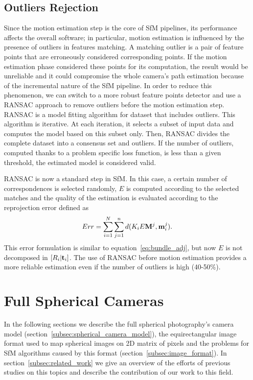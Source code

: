 \subsection{Outliers Rejection}
Since the motion estimation step is the core of SfM pipelines, its performance
affects the overall software; in particular, motion estimation is influenced 
by the presence of outliers in features matching.
A matching outlier is a pair of feature points that are erroneously considered 
corresponding points. If the motion estimation phase considered these points for
its computation, the result would be unreliable and it could compromise the 
whole camera's path estimation because of the incremental nature of the SfM 
pipeline.
In order to reduce this phenomenon, we can switch to a more robust feature points
detector and use a RANSAC approach to remove outliers before the motion estimation step.
RANSAC\cite{fischler1981random} is a model fitting algorithm for dataset that includes outliers.
This algorithm is iterative. At each iteration, it selects a subset of input data and computes the model based on this subset only. Then, RANSAC divides the complete dataset into a consensus set and outliers. If the number of outliers, computed thanks to a problem specific loss function, is
less than a given threshold, the estimated model is considered valid.

RANSAC is now a standard step in SfM. In this case, a certain number of correspondences is selected randomly, $E$ is computed 
according to the selected matches and the quality of the estimation is evaluated 
according to the reprojection error defined as
%
\begin{equation*}
	Err =  
	\sum_{i = 1}^N\sum_{j = 1}^n 
	d(K_iE\mathbf{M}^j, \mathbf{m}_i^j) \text{.}
\end{equation*}
%
This error formulation is similar to equation~\ref{eq:bundle_adj}, 
but now $E$ is not decomposed in $[R_i|\mathbf{t}_i]$. The use of RANSAC before motion estimation provides a more reliable 
estimation even if the number of outliers is high (40-50\%).

\section{Full Spherical Cameras}
In the following sections we describe the full spherical photography's camera
model (section~\ref{subsec:spherical_camera_model}), the equirectangular image
format used to map spherical images on 2D matrix of pixels 
and the problems for SfM algorithms caused by this format 
(section~\ref{subsec:image_format}).
In section~\ref{subsec:related_work} we give an overview of the efforts of 
previous studies on this topics and describe the contribution of our work to 
this field.

